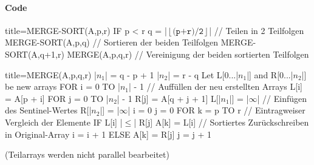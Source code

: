 \documentclass[
    ngerman,
    color=3b,
    dark_mode,
    load_common, %
    summary,
    boxarc,
]{rubos-tuda-template}
\begin{document}
\paragraph{Code}\mbox{}
\begin{codeBlock}[autogobble,escapeinside=||]{title={MERGE-SORT(A,p,r)}}
    IF p < r
      q = |$\left \lfloor \texttt{(p+r)/2} \right \rfloor$|        // Teilen in 2 Teilfolgen
      MERGE-SORT(A,p,q)   // Sortieren der beiden Teilfolgen
      MERGE-SORT(A,q+1,r)
      MERGE(A,p,q,r)      // Vereinigung der beiden sortierten Teilfolgen
\end{codeBlock}

\begin{codeBlock}[autogobble,escapeinside=||]{title={MERGE(A,p,q,r)}}
    |$n_1$| = q - p + 1
    |$n_2$| = r - q
    Let L[0...|$n_1$|] and R[0...|$n_2$|] be new arrays
    FOR i = 0 TO |$n_1$| - 1 // Auffüllen der neu erstellten Arrays
      L[i] = A[p + i]
    FOR j = 0 TO |$n_2$| - 1
      R[j] = A[q + j + 1]
    L[|$n_1$|] = |$\infty$| // Einfügen des Sentinel-Wertes
    R[|$n_2$|] = |$\infty$|
    i = 0
    j = 0
    FOR k = p TO r  // Eintragweiser Vergleich der Elemente
      IF L[i] |$\leq$| R[j]
          A[k] = L[i] // Sortiertes Zurückschreiben in Original-Array
          i = i + 1
      ELSE
          A[k] = R[j]
          j = j + 1
\end{codeBlock}
(Teilarrays werden nicht parallel bearbeitet)
\end{document}
